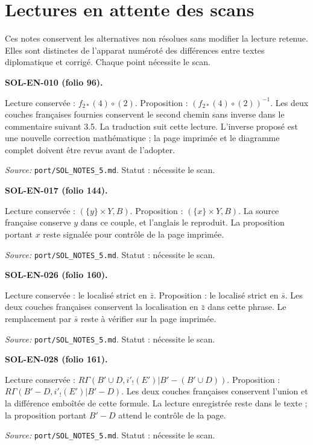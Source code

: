 \section*{Lectures en attente des scans}
\begingroup\small
Ces notes conservent les alternatives non résolues sans modifier la lecture retenue. Elles sont distinctes de l’apparat numéroté des différences entre textes diplomatique et corrigé. Chaque point nécessite le scan.

\medskip\noindent\textbf{SOL-EN-010 (folio 96).}\par
Lecture conservée : $f_{2*}(4)\circ(2)$. Proposition : $(f_{2*}(4)\circ(2))^{-1}$.
Les deux couches françaises fournies conservent le second chemin sans inverse dans le commentaire suivant 3.5. La traduction suit cette lecture. L’inverse proposé est une nouvelle correction mathématique ; la page imprimée et le diagramme complet doivent être revus avant de l’adopter.
\par\noindent\textit{Source: }\texttt{port/SOL\_NOTES\_5.md}. Statut : nécessite le scan.

\medskip\noindent\textbf{SOL-EN-017 (folio 144).}\par
Lecture conservée : $(\{y\}\times Y,B)$. Proposition : $(\{x\}\times Y,B)$.
La source française conserve $y$ dans ce couple, et l’anglais le reproduit. La proposition portant $x$ reste signalée pour contrôle de la page imprimée.
\par\noindent\textit{Source: }\texttt{port/SOL\_NOTES\_5.md}. Statut : nécessite le scan.

\medskip\noindent\textbf{SOL-EN-026 (folio 160).}\par
Lecture conservée : le localisé strict en $\bar z$. Proposition : le localisé strict en $\bar s$.
Les deux couches françaises conservent la localisation en $\bar z$ dans cette phrase. Le remplacement par $\bar s$ reste à vérifier sur la page imprimée.
\par\noindent\textit{Source: }\texttt{port/SOL\_NOTES\_5.md}. Statut : nécessite le scan.

\medskip\noindent\textbf{SOL-EN-028 (folio 161).}\par
Lecture conservée : $R\Gamma(B'\cup D,i'_!(E')|B'-(B'\cup D))$. Proposition : $R\Gamma(B'-D,i'_!(E')|B'-D)$.
Les deux couches françaises conservent l’union et la différence emboîtée de cette formule. La lecture enregistrée reste dans le texte ; la proposition portant $B'-D$ attend le contrôle de la page.
\par\noindent\textit{Source: }\texttt{port/SOL\_NOTES\_5.md}. Statut : nécessite le scan.


